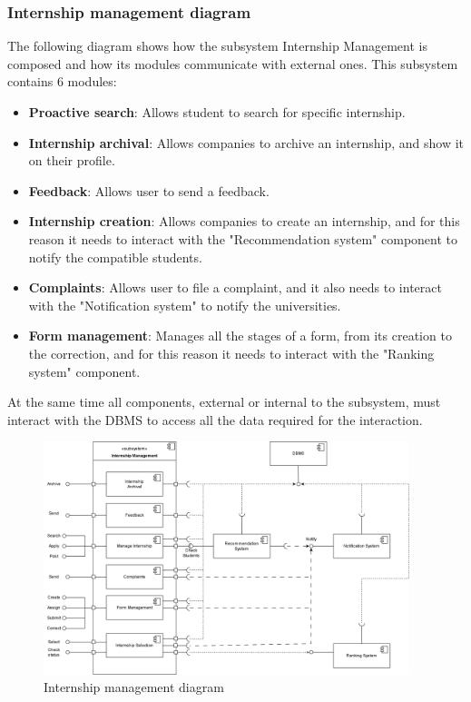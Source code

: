 \documentclass[11pt,twoside]{article}
\begin{document}
		\subsubsection{Internship management diagram}
The following diagram shows how the subsystem Internship Management is composed and how its modules communicate with external ones. This subsystem contains 6 modules:	
\begin{itemize}
\item \textbf{Proactive search}: Allows student to search for specific internship.
\item \textbf{Internship archival}: Allows companies to archive an internship, and show it on their profile.
\item \textbf{Feedback}: Allows user to send a feedback.
\item \textbf{Internship creation}: Allows companies to create an internship, and for this reason it needs to interact with the "Recommendation system" component to notify the compatible students.
\item \textbf{Complaints}: Allows user to file a complaint, and it also needs to interact with the "Notification system" to notify the universities.
\item \textbf{Form management}: Manages all the stages of a form, from its creation to the correction, and for this reason it needs to interact with the "Ranking system" component.
\end{itemize}
At the same time all components, external or internal to the subsystem, must interact with the DBMS to access all the data required for the interaction.
\newpage

\begin{figure}[H]
\centering
\includegraphics[width=0.95\textwidth]{Images/Component2}
\caption{Internship management diagram}\label{Component2}
\end{figure}
		
\end{document}
